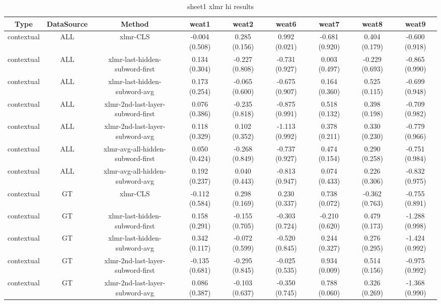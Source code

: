 \begin{sidewaystable}[htb]
    \centering
    \caption{sheet1 xlmr hi results}
    \label{appendix_tab:sheet1_xlmr_hi_results}
    \small
    \begin{tabular}{@{}ccccccccc@{}}
        \toprule
        Type & DataSource & Method & weat1 & weat2 & weat6 & weat7 & weat8 & weat9 \\
        \midrule
        contextual & ALL & xlmr-CLS & -0.004 (0.508) & 0.285 (0.156) & 0.992 (0.021) & -0.681 (0.920) & 0.404 (0.179) & -0.600 (0.918) \\
        contextual & ALL & xlmr-last-hidden-subword-first & 0.134 (0.304) & -0.227 (0.808) & -0.731 (0.927) & 0.003 (0.497) & -0.229 (0.693) & -0.865 (0.990) \\
        contextual & ALL & xlmr-last-hidden-subword-avg & 0.173 (0.254) & -0.065 (0.600) & -0.675 (0.907) & 0.164 (0.360) & 0.525 (0.115) & -0.699 (0.948) \\
        contextual & ALL & xlmr-2nd-last-layer-subword-first & 0.076 (0.386) & -0.235 (0.818) & -0.875 (0.991) & 0.518 (0.132) & 0.398 (0.198) & -0.709 (0.982) \\
        contextual & ALL & xlmr-2nd-last-layer-subword-avg & 0.118 (0.329) & 0.102 (0.352) & -1.113 (0.992) & 0.378 (0.211) & 0.330 (0.230) & -0.779 (0.966) \\
        contextual & ALL & xlmr-avg-all-hidden-subword-first & 0.050 (0.424) & -0.268 (0.849) & -0.737 (0.927) & 0.474 (0.154) & 0.290 (0.258) & -0.751 (0.984) \\
        contextual & ALL & xlmr-avg-all-hidden-subword-avg & 0.192 (0.237) & 0.040 (0.443) & -0.813 (0.947) & 0.074 (0.433) & 0.226 (0.306) & -0.832 (0.975) \\
        contextual & GT & xlmr-CLS & -0.112 (0.584) & 0.298 (0.169) & 0.230 (0.337) & 0.738 (0.072) & -0.362 (0.763) & -0.755 (0.891) \\
        contextual & GT & xlmr-last-hidden-subword-first & 0.158 (0.291) & -0.155 (0.705) & -0.303 (0.724) & -0.210 (0.620) & 0.479 (0.173) & -1.288 (0.998) \\
        contextual & GT & xlmr-last-hidden-subword-avg & 0.342 (0.117) & -0.072 (0.599) & -0.520 (0.845) & 0.244 (0.327) & 0.276 (0.295) & -1.424 (0.992) \\
        contextual & GT & xlmr-2nd-last-layer-subword-first & -0.135 (0.681) & -0.295 (0.845) & -0.025 (0.535) & 0.934 (0.009) & 0.514 (0.156) & -0.975 (0.992) \\
        contextual & GT & xlmr-2nd-last-layer-subword-avg & 0.086 (0.387) & -0.103 (0.637) & -0.350 (0.745) & 0.788 (0.060) & 0.326 (0.269) & -1.368 (0.990) \\

\end{tabular}
\end{sidewaystable}
